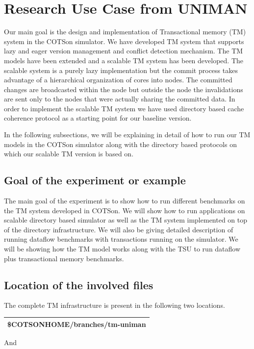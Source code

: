 \documentclass[a4paper]{article}
\begin{document}
\section[Research Use Case from UNIMAN]{Research Use Case from UNIMAN}
{
Our main goal is the design and implementation of Transactional memory
(TM) system in the COTSon simulator. We have developed TM system that
supports lazy and eager version management and conflict detection
mechanism. The TM models have been extended and a scalable TM system
has been developed. The scalable system is a purely lazy implementation
but the commit process takes advantage of a hierarchical organization
of cores into nodes. The committed changes are broadcasted within the
node but outside the node the invalidations are sent only to the nodes
that were actually sharing the committed data. In order to implement
the scalable TM system we have used directory based cache coherence
protocol as a starting point for our baseline version.}

{
In the following subsections, we will be explaining in detail of how to
run our TM models in the COTSon simulator along with the directory
based protocols on which our scalable TM version is based on.}

\subsection[Goal of the experiment or example]{Goal of the experiment or
example}
{
The main goal of the experiment is to show how to run different
benchmarks on the TM system developed in COTSon. We will show how to
run applications on scalable directory based simulator as well as the
TM system implemented on top of the directory infrastructure. We will
also be giving detailed description of running dataflow benchmarks with
transactions running on the simulator. We will be showing how the TM
model works along with the TSU to run dataflow plus transactional
memory benchmarks.}

\subsection[Location of the involved files]{Location of the involved
files}
{
The complete TM infrastructure is present in the following two
locations.}

\begin{flushleft}
\tablehead{}
\begin{supertabular}{|m{6.29346in}|}
\hline
{}\ttfamily
\$COTSONHOME/branches/tm-uniman\\\hline
\end{supertabular}
\end{flushleft}
{
And}
\end{document}
